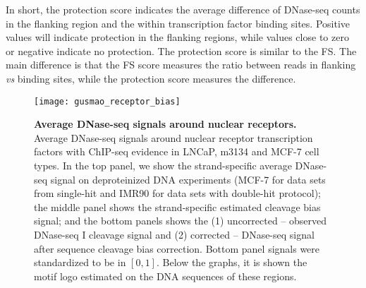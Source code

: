 In short, the protection score indicates the average difference of DNase-seq counts in the flanking region and the within transcription factor binding sites. Positive values will indicate protection in the flanking regions, while values close to zero or negative indicate no protection. The protection score is similar to the FS. The main difference is that the FS score measures the ratio between reads in flanking \textit{vs} binding sites, while the protection score measures the difference.

\begin{figure}[h!]
\centering
\texttt{[image: gusmao\_receptor\_bias]}
\caption[Average DNase-seq signals around binding sites of nuclear receptors]{\textbf{Average DNase-seq signals around nuclear receptors.} Average DNase-seq signals around nuclear receptor transcription factors with ChIP-seq evidence in LNCaP, m3134 and MCF-7 cell types. In the top panel, we show the strand-specific average DNase-seq signal on deproteinized DNA experiments (MCF-7 for data sets from single-hit and IMR90 for data sets with double-hit protocol); the middle panel shows the strand-specific estimated cleavage bias signal; and the bottom panels shows the (1) uncorrected -- observed DNase-seq I cleavage signal and (2) corrected -- DNase-seq signal after sequence cleavage bias correction. Bottom panel signals were standardized to be in $[0,1]$. Below the graphs, it is shown the motif logo estimated on the DNA sequences of these regions.}
\label{fig:gusmao_receptor_bias}
\end{figure}

